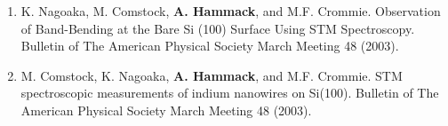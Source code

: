 {\begin{enumerate}
{        Sen Yang, \textbf{A.T. Hammack}, L.V. Butov, L.S. Levitov, B.D. Simons, and A.C. Gossard.
        Characterization of macroscopic ordering in exciton rings.
        Bulletin of The American Physical Society March Meeting 50 (2005).
        }
        \item {
        K. Nagoaka, M. Comstock, \textbf{A. Hammack}, and M.F. Crommie.
        Observation of Band-Bending at the Bare Si (100) Surface Using STM Spectroscopy.
        Bulletin of The American Physical Society March Meeting 48 (2003).
        }
        \item {
        M. Comstock, K. Nagoaka, \textbf{A. Hammack}, and M.F. Crommie.
        STM spectroscopic measurements of indium nanowires on Si(100).
        Bulletin of The American Physical Society March Meeting 48 (2003).
        }
        \setcounter{pubs}{\value{enumi}}
    \end{enumerate}
}